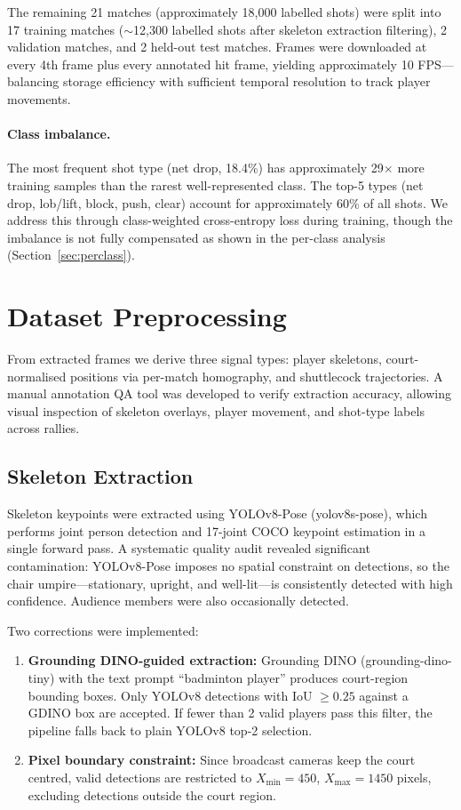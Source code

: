 \documentclass[11pt,a4paper]{article}
\begin{document}
The remaining 21 matches (approximately 18,000 labelled shots) were split into 17 training matches ($\sim$12,300 labelled shots after skeleton extraction filtering), 2 validation matches, and 2 held-out test matches. Frames were downloaded at every 4th frame plus every annotated hit frame, yielding approximately 10 FPS---balancing storage efficiency with sufficient temporal resolution to track player movements.

\paragraph{Class imbalance.} The most frequent shot type (net drop, 18.4\%) has approximately 29$\times$ more training samples than the rarest well-represented class. The top-5 types (net drop, lob/lift, block, push, clear) account for approximately 60\% of all shots. We address this through class-weighted cross-entropy loss during training, though the imbalance is not fully compensated as shown in the per-class analysis (Section~\ref{sec:perclass}).

\section{Dataset Preprocessing}

From extracted frames we derive three signal types: player skeletons, court-normalised positions via per-match homography, and shuttlecock trajectories. A manual annotation QA tool was developed to verify extraction accuracy, allowing visual inspection of skeleton overlays, player movement, and shot-type labels across rallies.

\subsection{Skeleton Extraction}

Skeleton keypoints were extracted using YOLOv8-Pose (yolov8s-pose), which performs joint person detection and 17-joint COCO keypoint estimation in a single forward pass. A systematic quality audit revealed significant contamination: YOLOv8-Pose imposes no spatial constraint on detections, so the chair umpire---stationary, upright, and well-lit---is consistently detected with high confidence. Audience members were also occasionally detected.

Two corrections were implemented:
\begin{enumerate}[leftmargin=*]
    \item \textbf{Grounding DINO-guided extraction:} Grounding DINO (grounding-dino-tiny) with the text prompt ``badminton player'' produces court-region bounding boxes. Only YOLOv8 detections with IoU $\geq 0.25$ against a GDINO box are accepted. If fewer than 2 valid players pass this filter, the pipeline falls back to plain YOLOv8 top-2 selection.
    \item \textbf{Pixel boundary constraint:} Since broadcast cameras keep the court centred, valid detections are restricted to $X_{\min} = 450$, $X_{\max} = 1450$ pixels, excluding detections outside the court region.
\end{enumerate}
\end{document}
